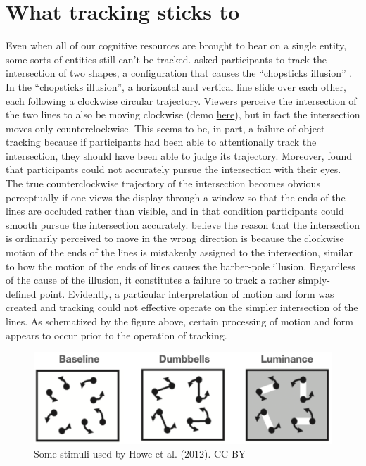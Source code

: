 \documentclass[
]{book}
\begin{document}
\hypertarget{what-tracking-sticks-to}{%
\section{What tracking sticks to}\label{what-tracking-sticks-to}}

Even when all of our cognitive resources are brought to bear on a single entity, some sorts of entities still can't be tracked. \citet{anstisEyesPursueMoving2010} asked participants to track the intersection of two shapes, a configuration that causes the ``chopsticks illusion'' \citet{anstisImperceptibleIntersectionsChopstick1990}. In the ``chopsticks illusion'', a horizontal and vertical line slide over each other, each following a clockwise circular trajectory. Viewers perceive the intersection of the two lines to also be moving clockwise (demo \href{http://anstislab.ucsd.edu/illusions/chopsticks-illusion/}{here}), but in fact the intersection moves only counterclockwise. This seems to be, in part, a failure of object tracking because if participants had been able to attentionally track the intersection, they should have been able to judge its trajectory. Moreover, \citet{anstisImperceptibleIntersectionsChopstick1990} found that participants could not accurately pursue the intersection with their eyes. The true counterclockwise trajectory of the intersection becomes obvious perceptually if one views the display through a window so that the ends of the lines are occluded rather than visible, and in that condition participants could smooth pursue the intersection accurately. \citet{anstisImperceptibleIntersectionsChopstick1990} believe the reason that the intersection is ordinarily perceived to move in the wrong direction is because the clockwise motion of the ends of the lines is mistakenly assigned to the intersection, similar to how the motion of the ends of lines causes the barber-pole illusion. Regardless of the cause of the illusion, it constitutes a failure to track a rather simply-defined point. Evidently, a particular interpretation of motion and form was created and tracking could not effective operate on the simpler intersection of the lines. As schematized by the figure above, certain processing of motion and form appears to occur prior to the operation of tracking.

\begin{figure}
\includegraphics[width=1\linewidth]{imagesForRmd/PiersHowe/PiersHoweStimuli} \caption{Some stimuli used by Howe et al. (2012). CC-BY}\label{fig:unnamed-chunk-4}
\end{figure}
\end{document}
